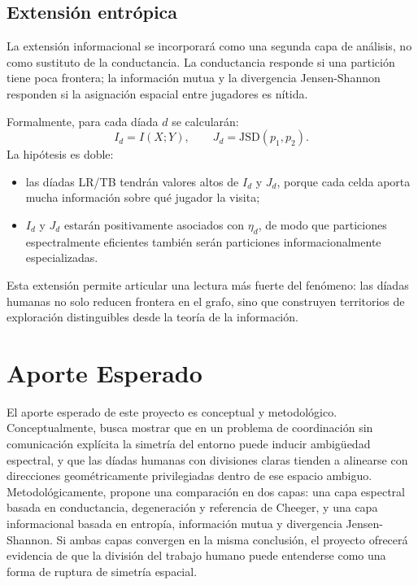 \documentclass[conference]{IEEEtran}
\begin{document}
\subsection{Extensión entrópica}

La extensión informacional se incorporará como una segunda capa de análisis, no como sustituto de la conductancia. La conductancia responde si una partición tiene poca frontera; la información mutua y la divergencia Jensen-Shannon responden si la asignación espacial entre jugadores es nítida.

Formalmente, para cada díada $d$ se calcularán:
\begin{equation}
I_d = I(X;Y), \qquad J_d = \mathrm{JSD}(p_1,p_2).
\end{equation}
La hipótesis es doble:
\begin{itemize}
    \item las díadas LR/TB tendrán valores altos de $I_d$ y $J_d$, porque cada celda aporta mucha información sobre qué jugador la visita;
    \item $I_d$ y $J_d$ estarán positivamente asociados con $\eta_d$, de modo que particiones espectralmente eficientes también serán particiones informacionalmente especializadas.
\end{itemize}
Esta extensión permite articular una lectura más fuerte del fenómeno: las díadas humanas no solo reducen frontera en el grafo, sino que construyen territorios de exploración distinguibles desde la teoría de la información.

\section{Aporte Esperado}

El aporte esperado de este proyecto es conceptual y metodológico. Conceptualmente, busca mostrar que en un problema de coordinación sin comunicación explícita la simetría del entorno puede inducir ambigüedad espectral, y que las díadas humanas con divisiones claras tienden a alinearse con direcciones geométricamente privilegiadas dentro de ese espacio ambiguo. Metodológicamente, propone una comparación en dos capas: una capa espectral basada en conductancia, degeneración y referencia de Cheeger, y una capa informacional basada en entropía, información mutua y divergencia Jensen-Shannon. Si ambas capas convergen en la misma conclusión, el proyecto ofrecerá evidencia de que la división del trabajo humano puede entenderse como una forma de ruptura de simetría espacial.
\end{document}
